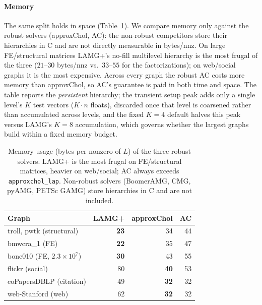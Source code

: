 \documentclass[leqno,letterpaper]{etna}
\begin{document}
\paragraph{Memory} The same split holds in space (Table~\ref{tab:memory}). We compare memory only
against the robust solvers (approxChol, AC): the non-robust competitors store their hierarchies in
C and are not directly measurable in bytes/nnz. On large FE/structural matrices LAMG+'s no-fill
multilevel hierarchy is the most frugal of the three ($21$--$30$ bytes/nnz vs.\
$33$--$55$ for the factorizations); on web/social graphs it is the most expensive. Across every graph the robust AC costs more memory than
approxChol, so AC's guarantee is paid in both time and space. The table
reports the \emph{persistent} hierarchy; the transient setup peak adds only a single level's
$K$ test vectors ($K{\cdot}n$ floats), discarded once that level is coarsened rather than accumulated
across levels, and the fixed $K{=}4$ default halves this peak versus LAMG's $K{=}8$
accumulation, which governs whether the largest graphs build within a fixed memory budget.

\begin{table}[t]\centering
\caption{Memory usage (bytes per nonzero of $L$) of the three robust solvers.
LAMG+ is the most frugal on FE/structural matrices, heavier on web/social; AC always
exceeds \texttt{approxchol\_lap}. Non-robust solvers (BoomerAMG, CMG, pyAMG, PETSc GAMG)
store hierarchies in C and are not included.}\label{tab:memory}
\begin{tabular}{lrrr}
\toprule
Graph & LAMG+ & approxChol & AC\\
\midrule
troll, pwtk (structural)   & \textbf{23} & 34 & 44\\
bmwcra\_1 (FE)             & \textbf{22} & 35 & 47\\
bone010 (FE, $2.3\!\times\!10^7$) & \textbf{30} & 43 & 55\\
flickr (social)            & 80 & \textbf{40} & 53\\
coPapersDBLP (citation)    & 49 & \textbf{32} & 32\\
web-Stanford (web)         & 62 & \textbf{32} & 32\\
\bottomrule
\end{tabular}
\end{table}
\end{document}
